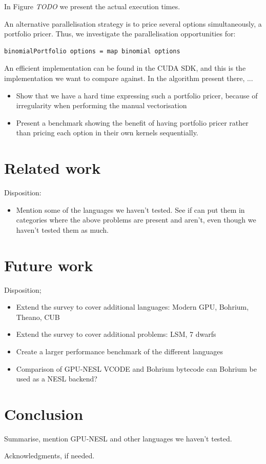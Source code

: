 \documentclass[preprint]{sigplanconf}
\begin{document}
In Figure \emph{TODO} we present the actual execution times.

An alternative parallelisation strategy is to price several
options simultaneously, a portfolio pricer. Thus, we investigate
the parallelisation opportunities for:
\begin{verbatim}
binomialPortfolio options = map binomial options
\end{verbatim}

An efficient implementation can be found in the CUDA SDK, and this is
the implementation we want to compare against. In the algorithm
present there, ...

\begin{itemize}
\item Show that we have a hard time expressing such a portfolio
  pricer, because of irregularity when performing the manual
  vectorisation
\item Present a benchmark showing the benefit of having portfolio
  pricer rather than pricing each option in their own kernels
  sequentially.
\end{itemize}

\section{Related work}
Disposition:
\begin{itemize}
\item Mention some of the languages we haven't tested. See if can put
  them in categories where the above problems are present and aren't,
  even though we haven't tested them as much.
\end{itemize}

\section{Future work}
Disposition;
\begin{itemize}
\item Extend the survey to cover additional languages:
  Modern GPU, Bohrium, Theano, CUB
\item Extend the survey to cover additional problems:
  LSM, 7 dwarfs
\item Create a larger performance benchmark of the different
  languages
\item Comparison of GPU-NESL VCODE and Bohrium bytecode
can Bohrium be used as a NESL backend?
\end{itemize}

\section{Conclusion}
Summarise, mention GPU-NESL and other languages we haven't tested.

\acks

Acknowledgments, if needed.




\end{document}
